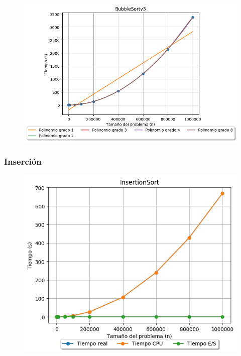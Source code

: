 \documentclass[12pt, fleqn]{report}                             %
\theoremstyle{break}                                            %
\begin{document}
    	        \begin{figure}[H]
    	            \centering
    	            \includegraphics[scale=0.9]{graphics/BubbleSortv3-Polynomials.png}
    	        \end{figure}
    	        
    	   \subsubsection{Inserción}
    	        \begin{figure}[H]
    	            \centering
    	            \includegraphics[scale=0.86]{graphics/InsertionSort-ExperimentalTimes.png}
    	        \end{figure}
    	        
\end{document}
